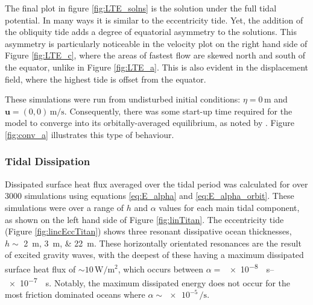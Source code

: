 The final plot in figure \ref{fig:LTE_solns} is the solution under the full tidal potential. In many ways it is similar to the eccentricity tide. Yet, the addition of the obliquity tide adds a degree of equatorial asymmetry to the solutions. This asymmetry is particularly noticeable in the velocity plot on the right hand side of Figure \ref{fig:LTE_c}, where the areas of fastest flow are skewed north and south of the equator, unlike in Figure \ref{fig:LTE_a}. This is also evident in the displacement field, where the highest tide is offset from the equator.

These simulations were run from undisturbed initial conditions: \hbox{$\eta = 0 \, \si{\metre}$} and \hbox{$\bm{u} = (0,0) \, \si{\metre\per\second}$}. Consequently, there was some start-up time required for the model to converge into its orbitally-averaged equilibrium, as noted by \citet{sears1995tidal}. Figure \ref{fig:conv_a} illustrates this type of behaviour.



\subsubsection{Tidal Dissipation \label{subsubsec:linTitan}}

Dissipated surface heat flux averaged over the tidal period was calculated for over 3000 simulations using equations \ref{eq:E_alpha} and \ref{eq:E_alpha_orbit}. These simulations were over a range of $h$ and $\alpha$ values for each main tidal component, as shown on the left hand side of Figure \ref{fig:linTitan}. The eccentricity tide (Figure \ref{fig:lincEccTitan}) shows three resonant dissipative ocean thicknesses, $h \sim$ \SIlist{2;3;22}{\metre}. These horizontally orientated resonances are the result of excited gravity waves, with the deepest of these having a maximum dissipated surface heat flux of $\sim 10\, \si{\watt\per\square\metre}$, which occurs between $\alpha =$ \SIrange{e-8}{e-7}{\per\second}. Notably, the maximum dissipated energy does not occur for the most friction dominated oceans where $\alpha \sim \num{e-5} \, \si{\per\second}$. 


